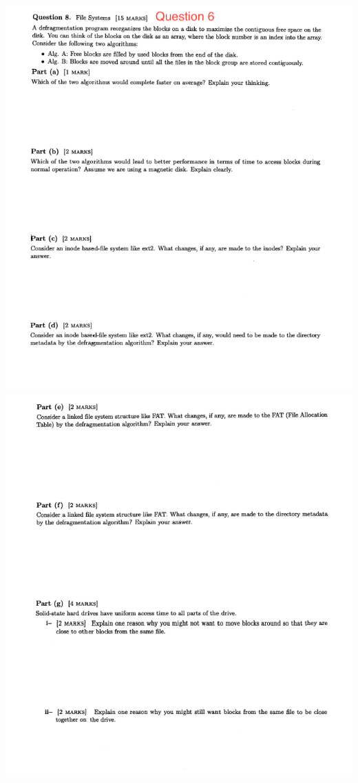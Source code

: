 \documentclass[12pt]{article}
\begin{document}
\begin{center}
\includegraphics[width=\linewidth]{../images/midterm_4_9.png}
\includegraphics[width=\linewidth]{../images/midterm_4_10.png}

\end{center}
\end{document}
